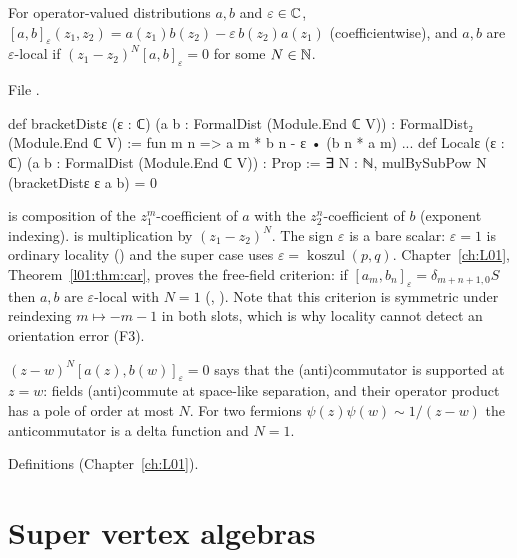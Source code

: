 \begin{definition}\label{l17:def:localeps}
For operator-valued distributions $a,b$ and $\varepsilon\in{\mathbb{C}}$,
$[a,b]_\varepsilon(z_1,z_2)=a(z_1)b(z_2)-\varepsilon\,b(z_2)a(z_1)$ (coefficientwise), and $a,b$ are
$\varepsilon$-local if $(z_1-z_2)^N[a,b]_\varepsilon=0$ for some $N\in{\mathbb{N}}$.
\end{definition}
\noindent File .
\begin{leancode}
def bracketDistε (ε : ℂ) (a b : FormalDist (Module.End ℂ V)) : FormalDist₂ (Module.End ℂ V) :=
  fun m n => a m * b n - ε • (b n * a m)
...
def Localε (ε : ℂ) (a b : FormalDist (Module.End ℂ V)) : Prop :=
  ∃ N : ℕ, mulBySubPow N (bracketDistε ε a b) = 0
\end{leancode}
\begin{dictionary}
 is composition of the $z_1^m$-coefficient of $a$ with the $z_2^n$-coefficient of $b$
(exponent indexing).  is multiplication by $(z_1-z_2)^N$. The sign $\varepsilon$ is
a bare scalar: $\varepsilon=1$ is ordinary locality () and the super case uses
$\varepsilon=\operatorname{koszul}(p,q)$. Chapter~\ref{ch:L01}, Theorem~\ref{l01:thm:car}, proves the
free-field criterion: if $[a_m,b_n]_\varepsilon=\delta_{m+n+1,0}S$ then $a,b$ are $\varepsilon$-local
with $N=1$ (, ). Note that this criterion is
symmetric under reindexing $m\mapsto-m-1$ in both slots, which is why locality cannot detect an
orientation error (F3).
\end{dictionary}
\begin{physics}
$(z-w)^N[a(z),b(w)]_\varepsilon=0$ says that the (anti)commutator is supported at $z=w$: fields
(anti)commute at space-like separation, and their operator product has a pole of order at most $N$.
For two fermions $\psi(z)\psi(w)\sim 1/(z-w)$ the anticommutator is a delta function and $N=1$.
\end{physics}
\begin{status}
Definitions (Chapter~\ref{ch:L01}).
\end{status}

\section{Super vertex algebras}\label{l17:sec:sva}

